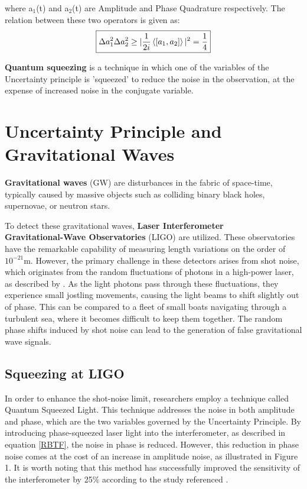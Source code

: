 \documentclass{article}
\begin{document}
where a$_1$(t) and a$_2$(t) are Amplitude and Phase Quadrature respectively. The relation between these two operators is given as:
\begin{equation}
\boxed{
\Delta a_{1}^2 \Delta a_{2}^2 \geq |\frac{1}{2i}\braket{[a_1,a_2]}|^2=\frac{1}{4} } 
\label{RBTF}
\end{equation}

\textbf{Quantum squeezing} is a technique in which one of the variables of the Uncertainty principle is 'squeezed' to reduce the noise in the observation, at the expense of increased noise in the conjugate variable.

\section{Uncertainty Principle and Gravitational Waves}

\textbf{Gravitational waves} (GW) are disturbances in the fabric of space-time, typically caused by massive objects such as colliding binary black holes, supernovae, or neutron stars.

To detect these gravitational waves, \textbf{Laser Interferometer \\Gravitational-Wave Observatories} (LIGO) are utilized. These observatories have the remarkable capability of measuring length variations on the order of $10^{-21}$m. However, the primary challenge in these detectors arises from shot noise, which originates from the random fluctuations of photons in a high-power laser, as described by \cite{Chu}. As the light photons pass through these fluctuations, they experience small jostling movements, causing the light beams to shift slightly out of phase. This can be compared to a fleet of small boats navigating through a turbulent sea, where it becomes difficult to keep them together. The random phase shifts induced by shot noise can lead to the generation of false gravitational wave signals.
 


\subsection*{Squeezing at LIGO}

In order to enhance the shot-noise limit, researchers employ a technique called Quantum Squeezed Light. This technique addresses the noise in both amplitude and phase, which are the two variables governed by the Uncertainty Principle. By introducing phase-squeezed laser light into the interferometer, as described in equation \eqref{RBTF}, the noise in phase is reduced. However, this reduction in phase noise comes at the cost of an increase in amplitude noise, as illustrated in Figure 1. It is worth noting that this method has successfully improved the sensitivity of the interferometer by 25$\%$ according to the study referenced \cite{6988398}.
\end{document}
